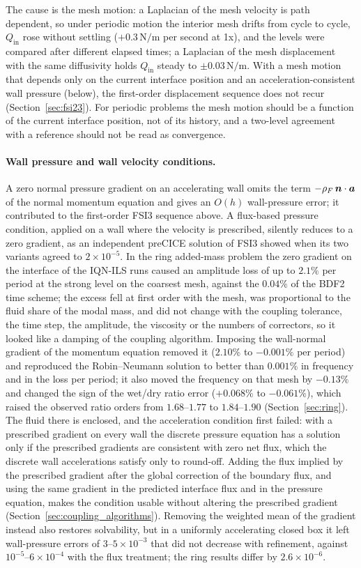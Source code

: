 The cause is the mesh motion: a Laplacian of the mesh velocity is path dependent, so under periodic motion the interior mesh drifts from cycle to cycle, $Q_\mathrm{in}$ rose without settling ($+0.3\,\mathrm{N/m}$ per second at 1x), and the levels were compared after different elapsed times; a Laplacian of the mesh displacement with the same diffusivity holds $Q_\mathrm{in}$ steady to $\pm0.03\,\mathrm{N/m}$.
With a mesh motion that depends only on the current interface position and an acceleration-consistent wall pressure (below), the first-order displacement sequence does not recur (Section~\ref{sec:fsi23}).
For periodic problems the mesh motion should be a function of the current interface position, not of its history, and a two-level agreement with a reference should not be read as convergence.

\paragraph{Wall pressure and wall velocity conditions.}
A zero normal pressure gradient on an accelerating wall omits the term $-\rho_F\,\boldsymbol{n}\cdot\boldsymbol{a}$ of the normal momentum equation and gives an $O(h)$ wall-pressure error; it contributed to the first-order FSI3 sequence above.
A flux-based pressure condition, applied on a wall where the velocity is prescribed, silently reduces to a zero gradient, as an independent preCICE solution of FSI3 showed when its two variants agreed to $2\times10^{-5}$.
In the ring added-mass problem the zero gradient on the interface of the IQN-ILS runs caused an amplitude loss of up to $2.1\%$ per period at the strong level on the coarsest mesh, against the $0.04\%$ of the BDF2 time scheme; the excess fell at first order with the mesh, was proportional to the fluid share of the modal mass, and did not change with the coupling tolerance, the time step, the amplitude, the viscosity or the numbers of correctors, so it looked like a damping of the coupling algorithm.
Imposing the wall-normal gradient of the momentum equation removed it ($2.10\%$ to $-0.001\%$ per period) and reproduced the Robin--Neumann solution to better than $0.001\%$ in frequency and in the loss per period; it also moved the frequency on that mesh by $-0.13\%$ and changed the sign of the wet/dry ratio error ($+0.068\%$ to $-0.061\%$), which raised the observed ratio orders from $1.68$--$1.77$ to $1.84$--$1.90$ (Section~\ref{sec:ring}).
The fluid there is enclosed, and the acceleration condition first failed: with a prescribed gradient on every wall the discrete pressure equation has a solution only if the prescribed gradients are consistent with zero net flux, which the discrete wall accelerations satisfy only to round-off. Adding the flux implied by the prescribed gradient after the global correction of the boundary flux, and using the same gradient in the predicted interface flux and in the pressure equation, makes the condition usable without altering the prescribed gradient (Section~\ref{sec:coupling_algorithms}). Removing the weighted mean of the gradient instead also restores solvability, but in a uniformly accelerating closed box it left wall-pressure errors of $3$--$5\times10^{-3}$ that did not decrease with refinement, against $10^{-5}$--$6\times10^{-4}$ with the flux treatment; the ring results differ by $2.6\times10^{-6}$.
